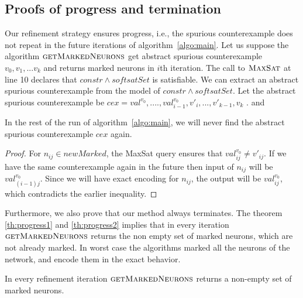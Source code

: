 \subsection{Proofs of progress and termination}

Our refinement strategy ensures progress, i.e., the spurious counterexample does not
repeat in the future
iterations of algorithm~\ref{algo:main}. Let us suppose the algorithm
$\textsc{getMarkedNeurons}$ get abstract spurious counterexample
${v_0}, {v_1}, ... {v_k}$ and
returns marked neurons in $i$th iteration.
The call to $\textsc{MaxSat}$ at line 10
declares that $constr \land softsatSet$ is satisfiable.
We can extract an abstract spurious counterexample from the model
of $constr \land softsatSet$.
Let the abstract spurious counterexample be $cex = val^{v_0}, ...., val^{v_0}_{i-1},v'_{i},...,v'_{k-1},v_k$ .
and

\begin{theorem}
  In the rest of the run of algorithm~\ref{algo:main}, we will never find the abstract
  spurious counterexample
  $cex$ again.
\end{theorem}
\begin{proof}
  For $n_{ij} \in newMarked$, the MaxSat query ensures that
  $val^{v_0}_{ij} \neq v'_{ij}$.
  If we have the same counterexample again in the future then
  input of $n_{ij}$ will be $val^{v_0}_{(i-1)j}$.
  Since we will have exact encoding for $n_{ij}$, the output
  will be $val^{v_0}_{ij}$, which contradicts the earlier inequality.  
\end{proof}

Furthermore, we also prove that our method always terminates.
%
The theorem \ref{th:progress1} and \ref{th:progress2} implies that in every
iteration $\textsc{getMarkedNeurons}$
returns the non empty set of marked neurons, which are not already marked. In worst case the algorithms marked all 
the neurons of the network, and encode them in the exact behavior. 





\begin{theorem}
  \label{th:progress1}
  In every refinement iteration $\textsc{getMarkedNeurons}$
  returns a non-empty set of marked neurons. 
\end{theorem}

